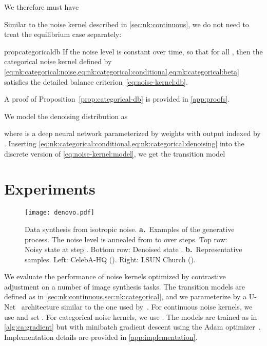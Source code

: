 \documentclass[10pt,twocolumn,letterpaper]{article}
\begin{document}
We therefore must have

Similar to the noise kernel described in \cref{sec:nk:continuous}, we do not need to treat the equilibrium case separately:
\begin{restatable}{prop}{categoricaldb}\label{prop:categorical-db}
  If the noise level is constant over time, so that  for all , then the categorical noise kernel defined by \cref*{eq:nk:categorical:noise,eq:nk:categorical:conditional,eq:nk:categorical:beta} satisfies the detailed balance criterion~\eqref{eq:noise-kernel:db}.
\end{restatable}

A proof of Proposition~\ref{prop:categorical-db} is provided in \cref{app:proofs}.

We model the denoising distribution as

where  is a deep neural network parameterized by weights  with output indexed by .
Inserting \cref{eq:nk:categorical:conditional,eq:nk:categorical:denoising} into the discrete version of \cref{eq:noise-kernel:model}, we get the transition model



\section{Experiments}\label{sec:experiments}

\begin{figure*}[t]
  \centering
  \texttt{[image: denovo.pdf]}\caption{Data synthesis from isotropic noise.
    \textbf{a.}~Examples of the generative process.
    The noise level is annealed from  to  over  steps.
    Top row: Noisy state  at step .
    Bottom row: Denoised state .
    \textbf{b.}~Representative samples.
    Left: CelebA-HQ (). Right: LSUN Church ().
  }\label{fig:imagesynthesis}
\end{figure*}

We evaluate the performance of noise kernels optimized by contrastive adjustment on a number of image synthesis tasks.
The transition models are defined as in \cref{sec:nk:continuous,sec:nk:categorical}, and we parameterize  by a U-Net~\cite{ronneberger2015u} architecture similar to the one used by~\textcite{hoogeboom2021argmax}.
For continuous noise kernels, we use  and set .
For categorical noise kernels, we use .
The models are trained as in \cref{alg:ca:gradient} but with minibatch gradient descent using the Adam optimizer~\cite{kingma2014adam}.
Implementation details are provided in \cref{app:implementation}.
\end{document}
